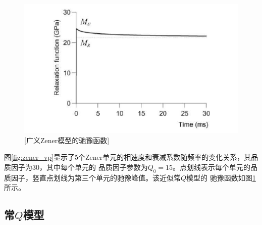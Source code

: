 \begin{figure}[!htbp]
	    \centering
		\includegraphics[width=0.7\linewidth]{figure/zener_rela}
		[广义Zener模型的驰豫函数]
		\label{fig:zener_rela}
\end{figure}
图\ref{fig:zener_vp}显示了5个Zener单元的相速度和衰减系数随频率的变化关系，其品质因子为30，其中每个单元的
品质因子参数为$Q_0=15$。点划线表示每个单元的品质因子，竖直点划线为第三个单元的驰豫峰值。该近似常$Q$模型的
驰豫函数如图\ref{fig:zener_rela}所示。


\vspace{0.5cm}
\subsection{常$Q$模型}
\vspace{0.5cm}


